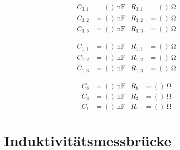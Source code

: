 \begin{align}
  C_{3,1}   &= ()\:\si{\nano\farad} & R_{3,1} &= ()\:\si{\ohm}\\
  C_{3,2}   &= ()\:\si{\nano\farad} & R_{3,2} &= ()\:\si{\ohm}\\
  C_{3,3}   &= ()\:\si{\nano\farad} & R_{3,3} &= ()\:\si{\ohm}
\end{align}

\begin{align}
  C_{1,1}   &= ()\:\si{\nano\farad} & R_{1,1} &= ()\:\si{\ohm}\\
  C_{1,2}   &= ()\:\si{\nano\farad} & R_{1,2} &= ()\:\si{\ohm}\\
  C_{1,3}   &= ()\:\si{\nano\farad} & R_{1,3} &= ()\:\si{\ohm}
\end{align}

\begin{align}
  C_{8}   &= ()\:\si{\nano\farad} & R_{8} &= ()\:\si{\ohm}\\
  C_{3}   &= ()\:\si{\nano\farad} & R_{3} &= ()\:\si{\ohm}\\
  C_{1}   &= ()\:\si{\nano\farad} & R_{1} &= ()\:\si{\ohm}
\end{align}

\section{Induktivitätsmessbrücke}
